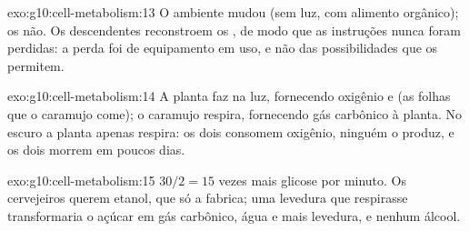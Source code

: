 \begin{solution}{exo:g10:cell-metabolism:13}
O ambiente mudou (sem luz, com alimento orgânico); os  não. Os
descendentes reconstroem os , de modo que as instruções
nunca foram perdidas: a perda foi de equipamento em uso, e não das
possibilidades que os  permitem.
\end{solution}

\begin{solution}{exo:g10:cell-metabolism:14}
A planta faz  na luz, fornecendo oxigênio e  (as folhas que o caramujo come); o caramujo respira,
fornecendo gás carbônico à planta. No escuro a planta apenas respira:
os dois consomem oxigênio, ninguém o produz, e os dois morrem em
poucos dias.
\end{solution}

\begin{solution}{exo:g10:cell-metabolism:15}
$30/2 = 15$ vezes mais glicose por minuto. Os cervejeiros querem
etanol, que só a  fabrica; uma levedura que respirasse
transformaria o açúcar em gás carbônico, água e mais levedura, e
nenhum álcool.
\end{solution}

